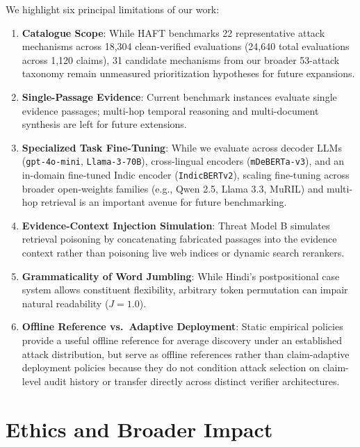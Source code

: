 \documentclass[11pt]{article}
\begin{document}
We highlight six principal limitations of our work:
\begin{enumerate}[leftmargin=1.4em,itemsep=1pt,topsep=2pt]
\item \textbf{Catalogue Scope}: While HAFT benchmarks 22 representative attack mechanisms across 18,304 clean-verified evaluations (24,640 total evaluations across 1,120 claims), 31 candidate mechanisms from our broader 53-attack taxonomy remain unmeasured prioritization hypotheses for future expansions.
\item \textbf{Single-Passage Evidence}: Current benchmark instances evaluate single evidence passages; multi-hop temporal reasoning and multi-document synthesis are left for future extensions.
\item \textbf{Specialized Task Fine-Tuning}: While we evaluate across decoder LLMs (\texttt{gpt-4o-mini}, \texttt{Llama-3-70B}), cross-lingual encoders (\texttt{mDeBERTa-v3}), and an in-domain fine-tuned Indic encoder (\texttt{IndicBERTv2}), scaling fine-tuning across broader open-weights families (e.g., Qwen 2.5, Llama 3.3, MuRIL) and multi-hop retrieval is an important avenue for future benchmarking.
\item \textbf{Evidence-Context Injection Simulation}: Threat Model B simulates retrieval poisoning by concatenating fabricated passages into the evidence context rather than poisoning live web indices or dynamic search rerankers.
\item \textbf{Grammaticality of Word Jumbling}: While Hindi's postpositional case system allows constituent flexibility, arbitrary token permutation can impair natural readability ($J=1.0$).
\item \textbf{Offline Reference vs.\ Adaptive Deployment}: Static empirical policies provide a useful offline reference for average discovery under an established attack distribution, but serve as offline references rather than claim-adaptive deployment policies because they do not condition attack selection on claim-level audit history or transfer directly across distinct verifier architectures.
\end{enumerate}

\section*{Ethics and Broader Impact}
\label{sec:ethics}
\end{document}
